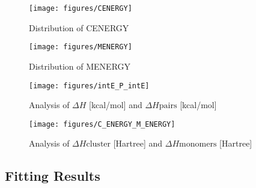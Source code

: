 \documentclass[journal=jacsat,manuscript=article]{achemso}
\begin{document}
\begin{figure}
    \centering
    \texttt{[image: figures/CENERGY]}
    \caption{ Distribution of CENERGY }
    \label{fig:_CENERGY}
\end{figure}

\begin{figure}
    \centering
    \texttt{[image: figures/MENERGY]}
    \caption{ Distribution of MENERGY }
    \label{fig:_MENERGY}
\end{figure}

\begin{figure}
    \centering
    \texttt{[image: figures/intE\_P\_intE]}
    \caption{ Analysis of $\Delta H$ [kcal/mol] and $\Delta H{\mathrm{pairs}}$ [kcal/mol] }
    \label{fig:_intE_P_intE}
\end{figure}

\begin{figure}
    \centering
    \texttt{[image: figures/C\_ENERGY\_M\_ENERGY]}
    \caption{ Analysis of $\Delta H{\mathrm{cluster}}$ [Hartree] and $\Delta H{\mathrm{monomers}}$ [Hartree] }
    \label{fig:_C_ENERGY_M_ENERGY}
\end{figure}
\newpage 
 \subsection{Fitting Results}
\end{document}
